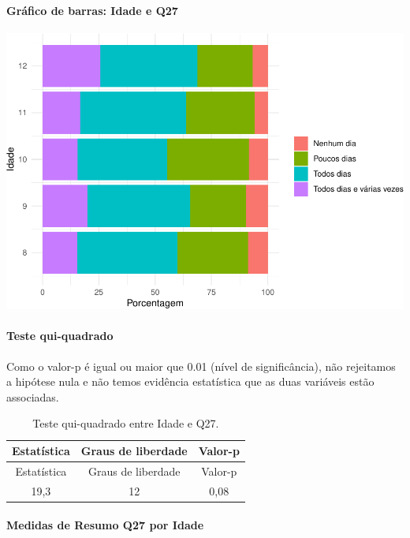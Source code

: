 \documentclass[]{article}
\let\oldparagraph\paragraph
\renewcommand{\paragraph}[1]{\oldparagraph{#1}\mbox{}}
\begin{document}
\hypertarget{gruxe1fico-de-barras-idade-e-q27}{%
\paragraph{Gráfico de barras: Idade e Q27}\label{gruxe1fico-de-barras-idade-e-q27}}

\begin{center}\includegraphics[width=0.75\linewidth]{relatorio_covid19_files/figure-latex/unnamed-chunk-800-1} \end{center}

\hypertarget{teste-qui-quadrado-69}{%
\paragraph{Teste qui-quadrado}\label{teste-qui-quadrado-69}}

Como o valor-p é igual ou maior que 0.01 (nível de significância), não rejeitamos a hipótese nula e não temos evidência estatística que as duas variáveis estão associadas.

\begin{longtable}[]{@{}ccc@{}}
\caption{\label{tab:unnamed-chunk-802}Teste qui-quadrado entre Idade e Q27.}\tabularnewline
\toprule
Estatística & Graus de liberdade & Valor-p\tabularnewline
\midrule
\endfirsthead
\toprule
Estatística & Graus de liberdade & Valor-p\tabularnewline
\midrule
\endhead
19,3 & 12 & 0,08\tabularnewline
\bottomrule
\end{longtable}

\cleardoublepage

\hypertarget{medidas-de-resumo-q27-por-idade}{%
\paragraph{Medidas de Resumo Q27 por Idade}\label{medidas-de-resumo-q27-por-idade}}
\end{document}
